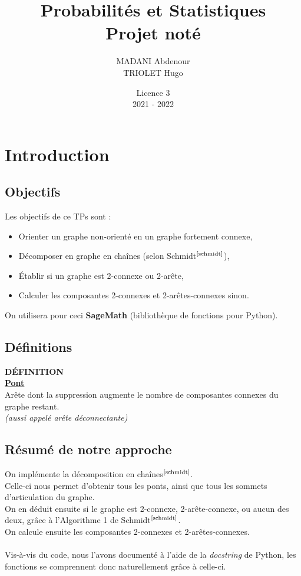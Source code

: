 \documentclass{article}      %
\title{Probabilités et Statistiques\\\Large{Projet noté}}
\author{MADANI Abdenour\\TRIOLET Hugo}
\date{Licence 3\\2021 - 2022}
\begin{document}
\normalsize
\maketitle

\renewcommand*\contentsname{Table des matières}
\tableofcontents
\newpage



\section{Introduction}
\subsection{Objectifs}
Les objectifs de ce TPs sont :
\begin{itemize}
  \item Orienter un graphe non-orienté en un graphe fortement connexe,
  \item Décomposer en graphe en chaînes (selon Schmidt$^\text{\cite{schmidt}}$),
  \item Établir si un graphe est 2-connexe ou 2-arête,
  \item Calculer les composantes 2-connexes et 2-arêtes-connexes sinon.
\end{itemize}

On utilisera pour ceci \textbf{SageMath} (bibliothèque de fonctions pour Python).



\subsection{Définitions}
\begin{definition}
{ \scriptsize \textcolor{definition}{ \textbf{DÉFINITION}}}
\vspace{3px}
\\ \underline{\textbf{Pont}}
\vspace{2.5px}
\\ Arête dont la suppression augmente le nombre de composantes connexes du graphe restant.%
\\ \textit{(aussi appelé arête déconnectante)}
\end{definition}


\subsection{Résumé de notre approche}
On implémente la décomposition en chaînes$^\text{\cite{schmidt}}$.
\\Celle-ci nous permet d'obtenir tous les ponts, ainsi que tous les sommets d'articulation du graphe.
\\On en déduit ensuite si le graphe est 2-connexe, 2-arête-connexe, ou aucun des deux, grâce à l'Algorithme 1 de Schmidt$^\text{\cite{schmidt}}$.
\\On calcule ensuite les composantes 2-connexes et 2-arêtes-connexes.
\\\\Vis-à-vis du code, nous l'avons documenté à l'aide de la \textit{docstring} de Python, les fonctions se comprennent donc naturellement grâce à celle-ci.
%
\end{document}
